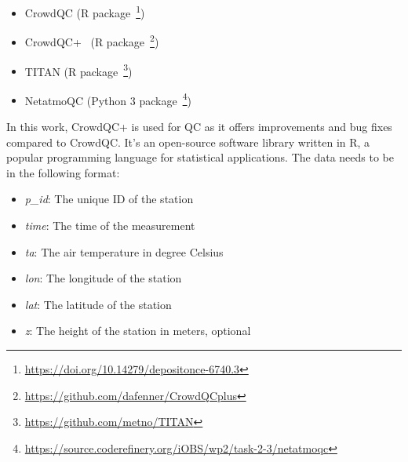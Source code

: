 \begin{itemize}
    \item CrowdQC (R package~\footnote{\url{https://doi.org/10.14279/depositonce-6740.3}})
    \item CrowdQC+~\cite{fenner2021crowdqc+} (R package~\footnote{\url{https://github.com/dafenner/CrowdQCplus}})
    \item TITAN (R package~\footnote{\url{https://github.com/metno/TITAN}})
    \item NetatmoQC (Python 3 package~\footnote{\url{https://source.coderefinery.org/iOBS/wp2/task-2-3/netatmoqc}})
\end{itemize}

In this work, CrowdQC+ is used for QC as it offers improvements and bug fixes compared to CrowdQC. It's an open-source software library written in R, a popular programming language for statistical applications. The data needs to be in the following format:

\begin{itemize}
    \item \textit{p\_id}: The unique ID of the station
    \item \textit{time}: The time of the measurement
    \item \textit{ta}: The air temperature in degree Celsius
    \item \textit{lon}: The longitude of the station
    \item \textit{lat}: The latitude of the station
    \item \textit{z}: The height of the station in meters, optional
\end{itemize}

